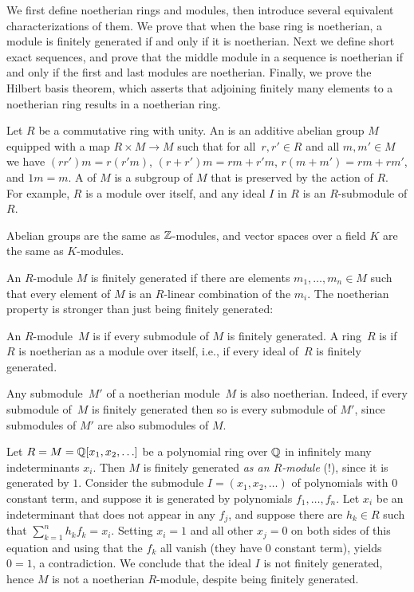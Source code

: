 We first define noetherian rings and modules, then introduce several
equivalent characterizations of them.  We prove that when the
base ring is noetherian, a module is finitely generated if and only if
it is noetherian.  Next we define short exact sequences, and prove
that the middle module in a sequence is noetherian if and only if the
first and last modules are noetherian.  Finally, we prove the Hilbert
basis theorem, which asserts that adjoining finitely many elements
to a noetherian ring results in a noetherian ring. 

Let $R$ be a commutative ring with unity.
An  is an additive abelian
group $M$ equipped with a map $R\times M \to M$ such that for all~$r,
r'\in R$ and all $m, m'\in M$ we have $(r r')m = r(r' m )$, $(r + r')m
= rm + r' m$, $r(m+m') = rm + rm'$, and $1m=m$.  A  of $M$
is a subgroup of $M$ that is preserved by the action of $R$.
For example, $R$ is a module over itself, and 
any ideal $I$ in $R$ is an $R$-submodule of $R$.

\begin{example}
Abelian groups are the same as $\mathbb{Z}$-modules, and vector spaces
over a field $K$ are the same as $K$-modules.
\end{example}

An $R$-module $M$ is finitely generated if there are elements $m_1, \ldots, m_n\in M$
such that every element of $M$ is an $R$-linear combination of the $m_i$.  The noetherian
property is stronger than just being finitely generated:

\begin{definition}[Noetherian] An $R$-module~$M$ is  if every
submodule of $M$ is finitely generated.  A ring~$R$ is
 if~$R$ is noetherian as a module over itself, i.e.,
if every ideal of~$R$ is finitely generated.
\end{definition}

Any submodule~$M'$ of a noetherian module~$M$ is also noetherian.
Indeed, if every submodule of~$M$ is finitely generated then so is
every submodule of $M'$, since submodules of $M'$ are also submodules
of $M$.

\begin{example}
Let $R=M=\mathbb{Q}[x_1,x_2,\ldots]$ be a polynomial ring over $\mathbb{Q}$ in
infinitely many indeterminants $x_i$.  Then $M$ is finitely generated
{\em as an $R$-module} (!), since it is generated by $1$.  Consider
the submodule $I=(x_1,x_2,\ldots)$ of polynomials with $0$ constant
term, and suppose it is generated by polynomials $f_1, \ldots, f_n$.
Let $x_i$ be an indeterminant that does not appear in any $f_j$, and
suppose there are $h_k\in R$ such that $\sum_{k=1}^n h_k f_k = x_i$.
Setting $x_i=1$ and all other $x_j=0$ on both sides of this equation
and using that the $f_k$ all vanish (they have 0 constant term),
yields $0=1$, a contradiction.  We conclude that the ideal $I$ is not
finitely generated, hence $M$ is not a noetherian $R$-module, despite
being finitely generated.
\end{example}

